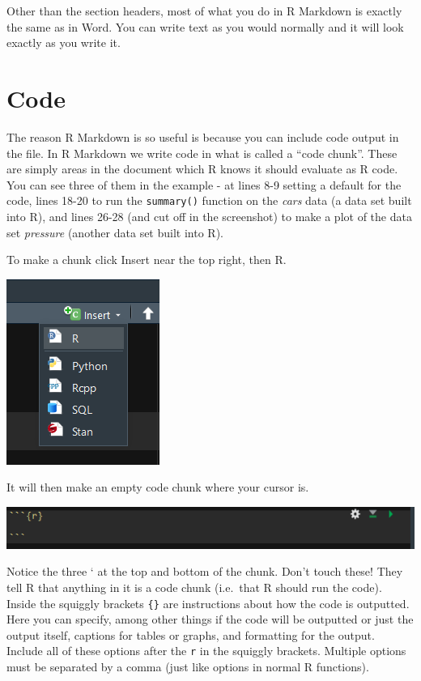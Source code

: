\documentclass[
  12pt,
]{book}
\begin{document}
Other than the section headers, most of what you do in R Markdown is exactly the same as in Word. You can write text as you would normally and it will look exactly as you write it.

\hypertarget{code-1}{%
\section{Code}\label{code-1}}

The reason R Markdown is so useful is because you can include code output in the file. In R Markdown we write code in what is called a ``code chunk''. These are simply areas in the document which R knows it should evaluate as R code. You can see three of them in the example - at lines 8-9 setting a default for the code, lines 18-20 to run the \texttt{summary()} function on the \emph{cars} data (a data set built into R), and lines 26-28 (and cut off in the screenshot) to make a plot of the data set \emph{pressure} (another data set built into R).

To make a chunk click Insert near the top right, then R.

\includegraphics{images/markdown3.PNG}

It will then make an empty code chunk where your cursor is.

\includegraphics{images/chunk_example.PNG}

Notice the three ` at the top and bottom of the chunk. Don't touch these! They tell R that anything in it is a code chunk (i.e.~that R should run the code). Inside the squiggly brackets \texttt{\{\}} are instructions about how the code is outputted. Here you can specify, among other things if the code will be outputted or just the output itself, captions for tables or graphs, and formatting for the output. Include all of these options after the \texttt{r} in the squiggly brackets. Multiple options must be separated by a comma (just like options in normal R functions).
\end{document}
